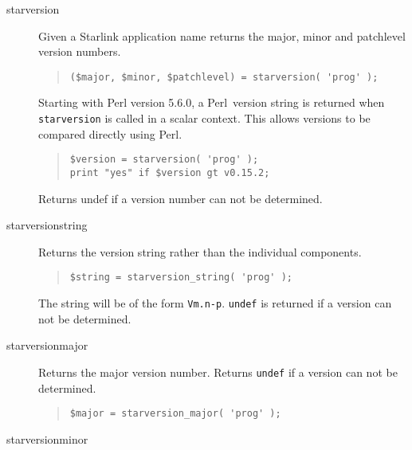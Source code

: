 \documentclass[twoside,11pt]{article}
\newenvironment{myquote}{\begin{quote}\begin{small}}{\end{small}\end{quote}}
\newcommand{\perl}{\xref{\textsf{Perl}}{sun193}{}}
\newcommand{\xref}[3]{#1}
\renewcommand{\_}{\texttt{\symbol{95}}}
\begin{document}
\begin{description}

\item[starversion] \mbox{}

Given a Starlink application name returns the major, minor and
patchlevel version numbers.

\begin{myquote}
\begin{verbatim}
($major, $minor, $patchlevel) = starversion( 'prog' );
\end{verbatim}
\end{myquote} %


Starting with Perl version 5.6.0, a \perl\ version string is returned
when \texttt{starversion} is called in a scalar context. This allows
versions to be compared directly using Perl.

\begin{myquote}
\begin{verbatim}
$version = starversion( 'prog' );
print "yes" if $version gt v0.15.2;
\end{verbatim}
\end{myquote}

Returns undef if a version number can not be determined.

\item[starversion\_string] \mbox{}

Returns the version string rather than the individual components.

\begin{myquote}
\begin{verbatim}
$string = starversion_string( 'prog' );
\end{verbatim}
\end{myquote} %

The string will be of the form \texttt{Vm.n-p}. \texttt{undef} is returned
if a version can not be determined.

\item[starversion\_major] \mbox{}

Returns the major version number. Returns \texttt{undef} if a version
can not be determined.

\begin{myquote}
\begin{verbatim}
$major = starversion_major( 'prog' );
\end{verbatim}
\end{myquote} %

\item[starversion\_minor] \mbox{}


\end{description}
\end{document}
